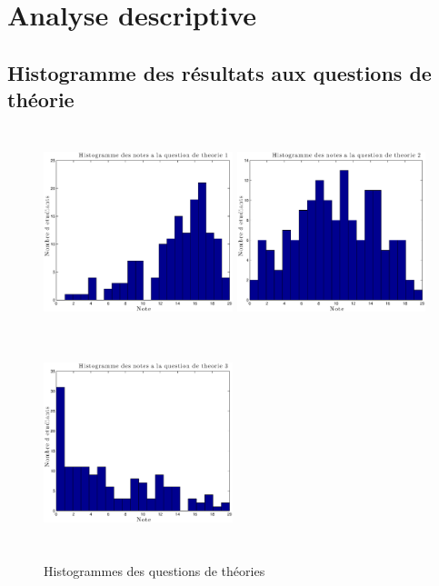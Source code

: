 \documentclass[a4paper, 11pt]{article}
\begin{document}
   \section{Analyse descriptive}
   \subsection{Histogramme des résultats aux questions de théorie}
   \begin{figure} [H]
	\begin{center}
		\includegraphics[height=6cm, width = 5.5cm]{Fig/Q1A1.eps}
		\includegraphics[height=6cm, width = 5.5cm]{Fig/Q1A2.eps}
		\includegraphics[height=6cm, width = 5.5cm]{Fig/Q1A3.eps}
		\caption{Histogrammes des questions de théories}
		\label{Q1A}
	\end{center}	
	\end{figure}
\end{document}
